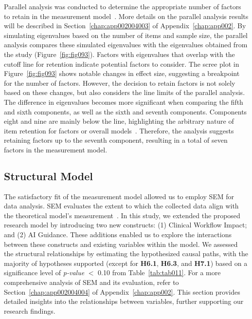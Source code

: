 Parallel analysis was conducted to determine the appropriate number of factors to retain in the measurement model~\cite{doi:10.1080/10705511.2019.1615835}.
More details on the parallel analysis results will be described in Section~\ref{chap:app002004003} of Appendix~\ref{chap:app002}.
By simulating eigenvalues based on the number of items and sample size, the parallel analysis compares these simulated eigenvalues with the eigenvalues obtained from the study (Figure~\ref{fig:fig093}).
Factors with eigenvalues that overlap with the cutoff line for retention indicate potential factors to consider.
The scree plot in Figure~\ref{fig:fig093} shows notable changes in effect size, suggesting a breakpoint for the number of factors.
However, the decision to retain factors is not solely based on these changes, but also considers the line limits of the parallel analysis.
The difference in eigenvalues becomes more significant when comparing the fifth and sixth components, as well as the sixth and seventh components.
Components eight and nine are mainly below the line, highlighting the arbitrary nature of item retention for factors or overall models~\cite{CALISTO2022102922}.
Therefore, the analysis suggests retaining factors up to the seventh component, resulting in a total of seven factors in the measurement model.

\subsection{Structural Model}
\label{sec:chap004005004}

The satisfactory fit of the measurement model allowed us to employ \ac{SEM} for data analysis.
\ac{SEM} evaluates the extent to which the collected data align with the theoretical model's measurement~\cite{doi:10.1080/10705511.2017.1401932}.
In this study, we extended the proposed research model by introducing two new constructs:
(1) Clinical Workflow Impact; and
(2) \ac{AI} Guidance.
These additions enabled us to explore the interactions between these constructs and existing variables within the model.
We assessed the structural relationships by estimating the hypothesized causal paths, with the majority of hypotheses supported (except for {\bf H6.1}, {\bf H6.3}, and {\bf H7.1}) based on a significance level of {\it p-value} $<$ 0.10 from Table~\ref{tab:tab011}.
For a more comprehensive analysis of \ac{SEM} and its evaluation, refer to Section~\ref{chap:app002004004} of Appendix~\ref{chap:app002}.
This section provides detailed insights into the relationships between variables, further supporting our research findings.

